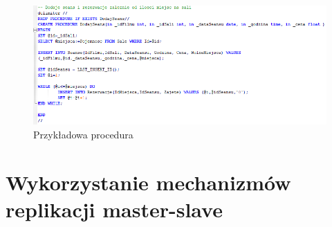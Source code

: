 \begin{figure} [H]
	\centering
	\includegraphics[width=1\linewidth]{rozdzial04/P_DodajSeans.png}
	\caption{Przykładowa procedura}
	\label{fig:p_DodajSeans}
\end{figure}

\section{Wykorzystanie mechanizmów replikacji master-slave}
